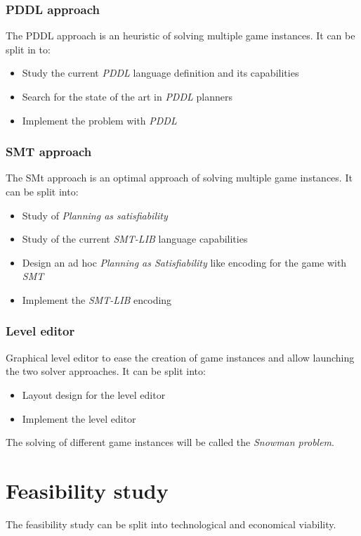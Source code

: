 \documentclass{report}
\theoremstyle{plain}
\begin{document}
\subsection{PDDL approach}
The PDDL approach is an heuristic of solving multiple game instances. It can be split in to:
\begin{itemize}
    \item Study the current \emph{PDDL} language definition and its capabilities
    \item Search for the state of the art in \emph{PDDL} planners
    \item Implement the problem with \emph{PDDL}
\end{itemize}

\subsection{SMT approach}
The SMt approach is an optimal approach of solving multiple game instances. It can be split into:
\begin{itemize}
    \item Study of \emph{Planning as satisfiability}
    \item Study of the current \emph{SMT-LIB} language capabilities
    \item Design an ad hoc \emph{Planning as Satisfiability} like encoding for the game with \emph{SMT}
    \item Implement the \emph{SMT-LIB} encoding
\end{itemize}
   
\subsection{Level editor}
Graphical level editor to ease the creation of game instances and allow launching the two solver approaches. It can be split into:
\begin{itemize}
    \item Layout design for the level editor
    \item Implement the level editor
\end{itemize}

The solving of different game instances will be called the \emph{Snowman problem}.

\chapter{Feasibility study}
The feasibility study can be split into technological and economical viability.
\end{document}
